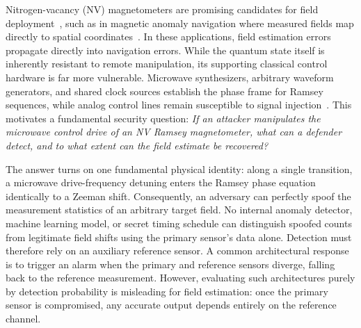 \documentclass[conference]{IEEEtran}
\begin{document}
Nitrogen-vacancy (NV) magnetometers are promising candidates for field deployment~\cite{barry2020sensitivity}, such as in magnetic anomaly navigation where measured fields map directly to spatial coordinates~\cite{canciani2016magnav}. In these applications, field estimation errors propagate directly into navigation errors. While the quantum state itself is inherently resistant to remote manipulation, its supporting classical control hardware is far more vulnerable. Microwave synthesizers, arbitrary waveform generators, and shared clock sources establish the phase frame for Ramsey sequences, while analog control lines remain susceptible to signal injection~\cite{kune2013ghost,shoukry2013abs}. This motivates a fundamental security question: \emph{If an attacker manipulates the microwave control drive of an NV Ramsey magnetometer, what can a defender detect, and to what extent can the field estimate be recovered?}

The answer turns on one fundamental physical identity: along a single transition, a microwave drive-frequency detuning enters the Ramsey phase equation identically to a Zeeman shift. Consequently, an adversary can perfectly spoof the measurement statistics of an arbitrary target field. No internal anomaly detector, machine learning model, or secret timing schedule can distinguish spoofed counts from legitimate field shifts using the primary sensor's data alone. Detection must therefore rely on an auxiliary reference sensor. A common architectural response is to trigger an alarm when the primary and reference sensors diverge, falling back to the reference measurement. However, evaluating such architectures purely by detection probability is misleading for field estimation: once the primary sensor is compromised, any accurate output depends entirely on the reference channel.
\end{document}
